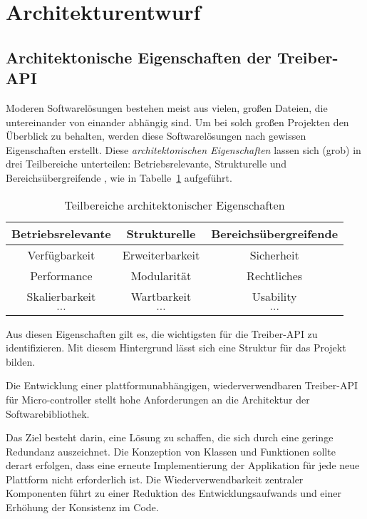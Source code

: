\section{Architekturentwurf}

\label{sec:architecture_properties}
\subsection{Architektonische Eigenschaften der Treiber-API}
Moderen Softwarelösungen bestehen meist aus vielen, großen Dateien, die untereinander von einander abhängig sind.
Um bei solch großen Projekten den Überblick zu behalten, werden diese Softwarelösungen nach gewissen Eigenschaften erstellt.
Diese \emph{architektonischen Eigenschaften} lassen sich (grob) in drei Teilbereiche unterteilen: Betriebsrelevante, Strukturelle und Bereichsübergreifende \cite{barlik_architektur}, wie in Tabelle~\ref{tab:architektonische_eigenschaften} aufgeführt. %

\begin{table}[H]
	\begin{center}
		\begin{tabular}{ c | c | c }
		\toprule
			\textbf{Betriebsrelevante} & \textbf{Strukturelle} & \textbf{Bereichsübergreifende}\\
			\midrule
			Verfügbarkeit & Erweiterbarkeit & Sicherheit\\
			Performance & Modularität & Rechtliches\\
			Skalierbarkeit & Wartbarkeit & Usability\\
			$\cdots$ & $\cdots$ & $\cdots$\\
			\bottomrule
		\end{tabular}
		\caption{Teilbereiche architektonischer Eigenschaften}
	    \label{tab:architektonische_eigenschaften}
	\end{center}
\end{table}

Aus diesen Eigenschaften gilt es, die wichtigsten für die Treiber-API zu identifizieren. 
Mit diesem Hintergrund lässt sich eine Struktur für das Projekt bilden.

Die Entwicklung einer plattformunabhängigen, wiederverwendbaren Treiber-API für Micro-controller stellt hohe Anforderungen an die Architektur der Softwarebibliothek.

Das Ziel besteht darin, eine Lösung zu schaffen, die sich durch eine geringe Redundanz auszeichnet. 
Die Konzeption von Klassen und Funktionen sollte derart erfolgen, dass eine erneute Implementierung der Applikation für jede neue Plattform nicht erforderlich ist.
Die Wiederverwendbarkeit zentraler Komponenten führt zu einer Reduktion des Entwicklungsaufwands und einer Erhöhung der Konsistenz im Code.

